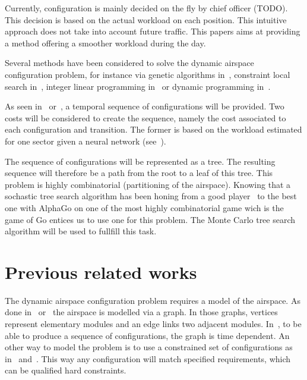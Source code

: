 \documentclass[twoside,twocolumn]{article}
\begin{document}
Currently, configuration is mainly decided on the fly by chief officer (TODO).
This decision is based on the actual workload on each position. This intuitive
approach does not take into account future traffic. This papers aims at
providing a method offering a smoother workload during the day.

Several methods have been considered to solve the dynamic airspace configuration
problem, for instance via genetic algorithms in~\cite{sergeeva2017dynamic},
constraint local search in~\cite{jagare2013airspace}, integer linear
programming in~\cite{treimuth2016branch} or dynamic programming
in~\cite{bloem2010dynamic}.

As seen in~\cite{treimuth2016branch}
or~\cite{sergeeva2017dynamic}, a temporal sequence of configurations will be
provided. Two costs will be considered to create the sequence, namely the cost
associated to each configuration and transition. The former is based on the
workload estimated for one sector given a neural network
(see~\cite{gianazza2010forecasting}).

The sequence of configurations will be represented as a tree. The resulting
sequence will therefore be a path from the root to a leaf of this tree. This
problem is highly combinatorial (partitioning of the airspace). Knowing that a
sochastic tree search algorithm has been honing from a good
player~\cite{gelly2012grand} to the best one with AlphaGo on one of the most
highly combinatorial game wich is the game of Go entices us to use one for this
problem. The Monte Carlo tree search~\cite{browne2012survey} algorithm will be
used to fullfill this task.



\section{Previous related works}
\label{sec:previous_related_works}

The dynamic airspace configuration problem requires a model of the airspace. As
done in~\cite{sergeeva2017dynamic} or~\cite{treimuth2016branch} the airspace
is modelled via a graph. In those graphs, vertices represent elementary modules
and an edge links two adjacent modules. In~\cite{treimuth2016branch}, to be
able to produce a sequence of configurations, the graph is time dependent.
An other way to model the problem is to use a constrained set of
configurations as in~\cite{gianazza2010forecasting} and~\cite{bloem2010dynamic}.
This way any configuration will match specified requirements, which can be
qualified hard constraints.
\end{document}
